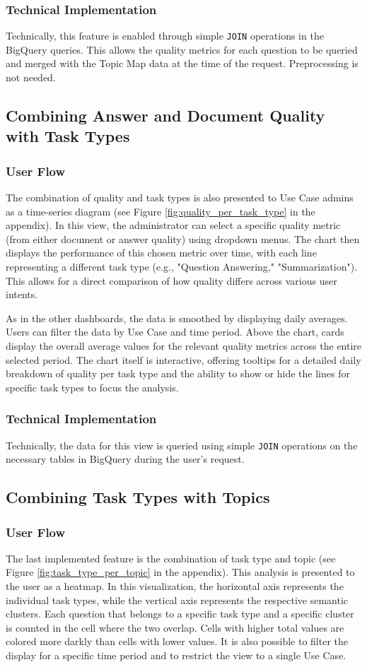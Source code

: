 \documentclass[
	english,
	ruledheaders=section,%
	class=report,%
	thesis={type=bachelor},%
	accentcolor=1b,%
	custommargins=true,%
	marginpar=false,%
	parskip=half-,%
	fontsize=11pt,%
	DIV=14,
]{tudapub}
\begin{document}
\subsubsection{Technical Implementation}
Technically, this feature is enabled through simple \texttt{JOIN} operations in the BigQuery queries. This allows the quality metrics for each question to be queried and merged with the Topic Map data at the time of the request. Preprocessing is not needed.
\subsection{Combining Answer and Document Quality with Task Types}
\subsubsection{User Flow}
The combination of quality and task types is also presented to Use Case admins as a time-series diagram (see Figure \ref{fig:quality_per_task_type} in the appendix). In this view, the administrator can select a specific quality metric (from either document or answer quality) using dropdown menus. The chart then displays the performance of this chosen metric over time, with each line representing a different task type (e.g., "Question Answering," "Summarization"). This allows for a direct comparison of how quality differs across various user intents.

As in the other dashboards, the data is smoothed by displaying daily averages. Users can filter the data by Use Case and time period. Above the chart, cards display the overall average values for the relevant quality metrics across the entire selected period. The chart itself is interactive, offering tooltips for a detailed daily breakdown of quality per task type and the ability to show or hide the lines for specific task types to focus the analysis.
\subsubsection{Technical Implementation}
Technically, the data for this view is queried using simple \texttt{JOIN} operations on the necessary tables in BigQuery during the user's request.
\subsection{Combining Task Types with Topics}
\subsubsection{User Flow}
The last implemented feature is the combination of task type and topic (see Figure  \ref{fig:task_type_per_topic} in the appendix). This analysis is presented to the user as a heatmap. In this visualization, the horizontal axis represents the individual task types, while the vertical axis represents the respective semantic clusters. Each question that belongs to a specific task type and a specific cluster is counted in the cell where the two overlap. Cells with higher total values are colored more darkly than cells with lower values. It is also possible to filter the display for a specific time period and to restrict the view to a single Use Case.
\end{document}
